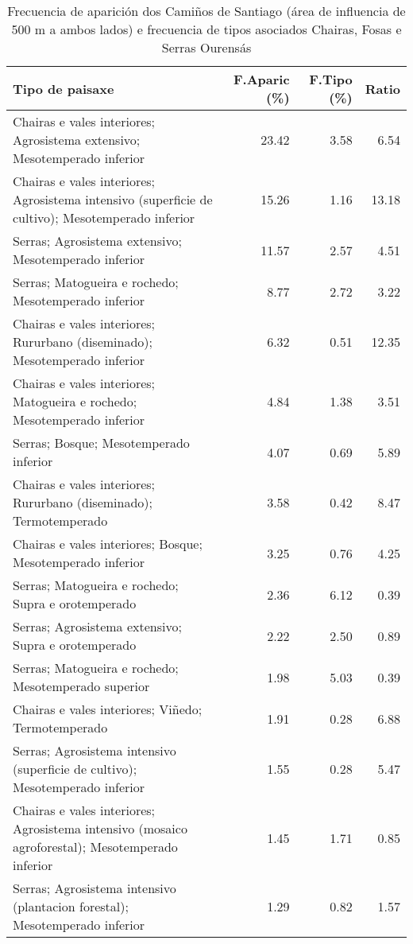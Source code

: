 \begin{table}[p]
\centering
\caption{Frecuencia de aparición dos Camiños de Santiago (área de influencia de 500 m a ambos lados) e frecuencia de tipos asociados Chairas, Fosas e Serras Ourensás} 
\label{vcamino8}
\begin{tabular}{lrrr}
  \hline
Tipo de paisaxe & F.Aparic (\%) & F.Tipo (\%) & Ratio \\ 
  \hline
Chairas e vales interiores; Agrosistema extensivo; Mesotemperado inferior & 23.42 & 3.58 & 6.54 \\ 
  Chairas e vales interiores; Agrosistema intensivo (superficie de cultivo); Mesotemperado inferior & 15.26 & 1.16 & 13.18 \\ 
  Serras; Agrosistema extensivo; Mesotemperado inferior & 11.57 & 2.57 & 4.51 \\ 
  Serras; Matogueira e rochedo; Mesotemperado inferior & 8.77 & 2.72 & 3.22 \\ 
  Chairas e vales interiores; Rururbano (diseminado); Mesotemperado inferior & 6.32 & 0.51 & 12.35 \\ 
  Chairas e vales interiores; Matogueira e rochedo; Mesotemperado inferior & 4.84 & 1.38 & 3.51 \\ 
  Serras; Bosque; Mesotemperado inferior & 4.07 & 0.69 & 5.89 \\ 
  Chairas e vales interiores; Rururbano (diseminado); Termotemperado & 3.58 & 0.42 & 8.47 \\ 
  Chairas e vales interiores; Bosque; Mesotemperado inferior & 3.25 & 0.76 & 4.25 \\ 
  Serras; Matogueira e rochedo; Supra e orotemperado & 2.36 & 6.12 & 0.39 \\ 
  Serras; Agrosistema extensivo; Supra e orotemperado & 2.22 & 2.50 & 0.89 \\ 
  Serras; Matogueira e rochedo; Mesotemperado superior & 1.98 & 5.03 & 0.39 \\ 
  Chairas e vales interiores; Viñedo; Termotemperado & 1.91 & 0.28 & 6.88 \\ 
  Serras; Agrosistema intensivo (superficie de cultivo); Mesotemperado inferior & 1.55 & 0.28 & 5.47 \\ 
  Chairas e vales interiores; Agrosistema intensivo (mosaico agroforestal); Mesotemperado inferior & 1.45 & 1.71 & 0.85 \\ 
  Serras; Agrosistema intensivo (plantacion forestal); Mesotemperado inferior & 1.29 & 0.82 & 1.57 \\ 
   \hline
\end{tabular}
\end{table}
